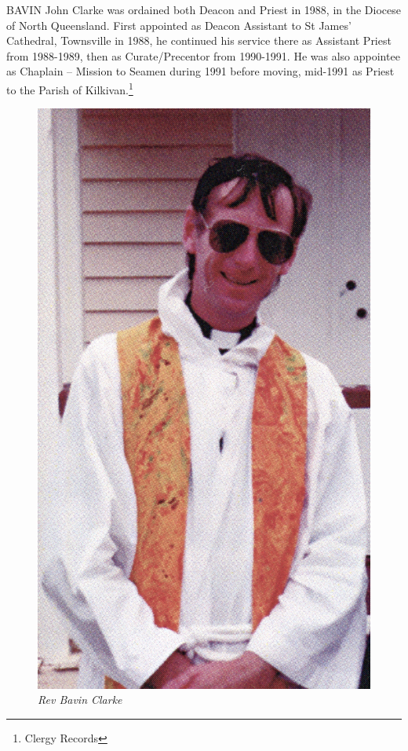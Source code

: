 \lettrine[lines=3]{B}{AVIN}
 John Clarke was ordained both Deacon and Priest in 1988, in the Diocese of North Queensland. First appointed as Deacon Assistant to St James' Cathedral, Townsville in 1988, he continued his service there as Assistant Priest from 1988-1989, then as Curate/Precentor from 1990-1991. He was also appointee as Chaplain -- Mission to Seamen during 1991 before moving, mid-1991 as Priest to the Parish of Kilkivan.\footnote{Clergy Records}







\begin{figure}
\begin{center}
\includegraphics[width=1.\linewidth,center]{../images/bavin.jpg}
\caption{\itshape Rev Bavin Clarke}
\end{center}
\end{figure}




